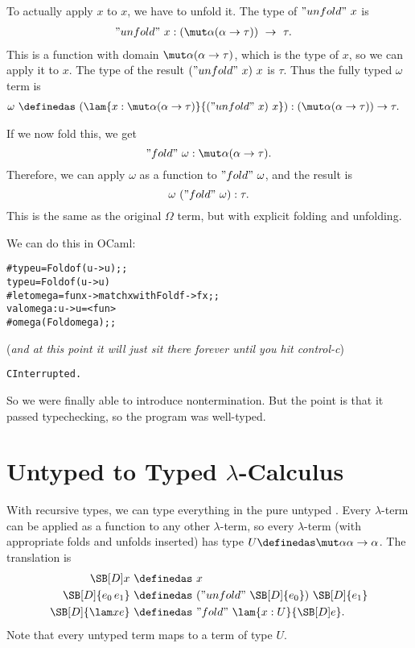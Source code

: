 To actually apply $x$ to $x$, we have to unfold it. The type of $"unfold"~x$ is
\begin{align*}
"unfold"~x : (\mut\alpha{(\alpha\to\tau)})\ &\to\ \tau.
\end{align*}
This is a function with domain $\mut\alpha{(\alpha\to\tau)}$, which is the type of $x$, so we can apply it to $x$. The type of the result $("unfold"~x)~x$ is $\tau$. Thus the fully typed $\omega$ term is
\begin{align*}
\omega\ &\definedas\ (\lam{x : \mut\alpha{(\alpha\to\tau)}}{("unfold"~x)~x}) : (\mut\alpha{(\alpha\to\tau)})\to\tau.
\end{align*}

If we now fold this, we get
\[
"fold"~\omega : \mut\alpha{(\alpha\to\tau)}.
\]
Therefore, we can apply $\omega$ as a function to $"fold"~\omega$, and the result is
\[
\omega~("fold"~\omega) : \tau.
\]
This is the same as the original $\Omega$ term, but with explicit folding and unfolding.

We can do this in OCaml:
\begin{small}
\begin{alltt}
   \# type u = Fold of (u -> u);;
   type u = Fold of (u -> u)
   \# let omega = fun x -> match x with Fold f -> f x;;
   val omega : u -> u = <fun>
   \# omega (Fold omega);;
\end{alltt}
\end{small}
(\textit{and at this point it will just sit there forever until you hit control-c})
\begin{small}
\begin{alltt}
   {\caret}CInterrupted.
\end{alltt}
\end{small}
So we were finally able to introduce nontermination. But the point is that it passed typechecking, so the program was well-typed.

\section{Untyped to Typed $\lambda$-Calculus}

With recursive types, we can type everything in the pure untyped \lamcal. Every $\lambda$-term can be applied as a function to any other $\lambda$-term, so every $\lambda$-term (with appropriate folds and unfolds inserted) has type $U \definedas \mut\alpha{\alpha\to\alpha}$. The translation is
\begin{align*}
\SB[D]x\ &\definedas\ x\\
\SB[D]{e_0\,e_1}\ &\definedas\ ("unfold"~\SB[D]{e_0})~\SB[D]{e_1}\\
\SB[D]{\lam xe}\ &\definedas\ "fold"~\lam{x:U}{\SB[D]e}.
\end{align*}
Note that every untyped term maps to a term of type $U$.
